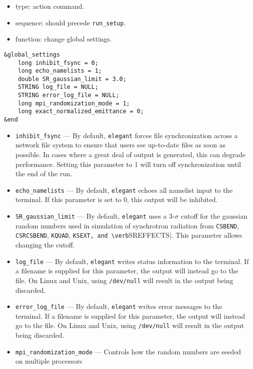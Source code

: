 \documentclass[11pt]{article}
\begin{document}
\begin{itemize}
\item type: action command.  
\item sequence: should precede \verb|run_setup|.
\item function: change global settings.
\end{itemize}

\begin{verbatim}
&global_settings
    long inhibit_fsync = 0;
    long echo_namelists = 1;
    double SR_gaussian_limit = 3.0;
    STRING log_file = NULL;
    STRING error_log_file = NULL;
    long mpi_randomization_mode = 1;
    long exact_normalized_emittance = 0;
&end
\end{verbatim}

\begin{itemize}
\item \verb|inhibit_fsync| --- By default, \verb|elegant| forces file synchronization across a network file system
  to ensure that users see up-to-date files as soon as possible.  In cases where a great deal of output is generated,
  this can degrade performance.  Setting this parameter to 1 will turn off synchronization until the end of the run.
\item \verb|echo_namelists| --- By default, \verb|elegant| echoes all namelist input to the terminal.  If this parameter
  is set to 0, this output will be inhibited.
\item \verb|SR_gaussian_limit| --- By default, \verb|elegant| uses a 3-$\sigma$ cutoff for the gaussian random numbers used
  in simulation of synchrotron radiation from \verb|CSBEND|, \verb|CSRCSBEND|, \verb|KQUAD|, \verb|KSEXT, and \verb|SREFFECTS|.
  This parameter allows changing the cutoff.
\item \verb|log_file| --- By default, \verb|elegant| writes status information to the terminal.  If a filename is supplied
  for this parameter, the output will instead go to the file.  On Linux and Unix, using \verb|/dev/null| will result in 
  the output being discarded.
\item \verb|error_log_file| --- By default, \verb|elegant| writes error messages to the terminal.  If a filename is supplied
  for this parameter, the output will instead go to the file.  On Linux and Unix, using \verb|/dev/null| will result in 
  the output being discarded.
\item \verb|mpi_randomization_mode| --- Controls how the random numbers are seeded on multiple processors
  \begin{itemize}

\end{itemize}
\end{itemize}
\end{document}
